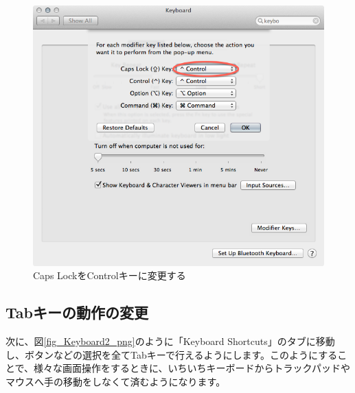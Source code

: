 \begin{figure}
  \begin{center}
    \includegraphics[scale=0.4,bb= 0 0 668 636]{fig/Keyboard1.png}
    \caption{Caps LockをControlキーに変更する}
    \label{fig_Keyboard1_png}
  \end{center}
\end{figure}

\subsection{Tabキーの動作の変更}
次に、図\ref{fig_Keyboard2_png}のように「Keyboard Shortcuts」のタブに移動し、ボタンなどの選択を全てTabキーで行えるようにします。このようにすることで、様々な画面操作をするときに、いちいちキーボードからトラックパッドやマウスへ手の移動をしなくて済むようになります。

